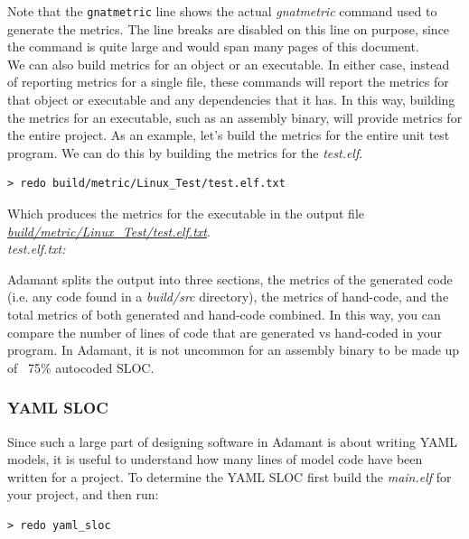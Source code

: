 Note that the \texttt{gnatmetric} line shows the actual \textit{gnatmetric} command used to generate the metrics. The line breaks are disabled on this line on purpose, since the command is quite large and would span many pages of this document. \\

We can also build metrics for an object or an executable. In either case, instead of reporting metrics for a single file, these commands will report the metrics for that object or executable and any dependencies that it has. In this way, building the metrics for an executable, such as an assembly binary, will provide metrics for the entire project. As an example, let's build the metrics for the entire unit test program. We can do this by building the metrics for the \textit{test.elf}.

\vspace{5mm} %
\begin{verbatim}
> redo build/metric/Linux_Test/test.elf.txt
\end{verbatim}
\vspace{5mm} %

Which produces the metrics for the executable in the output file \textit{\url{build/metric/Linux\_Test/test.elf.txt}}. \\

\textit{test.elf.txt:}

Adamant splits the output into three sections, the metrics of the generated code (i.e. any code found in a \textit{build/src} directory), the metrics of hand-code, and the total metrics of both generated and hand-code combined. In this way, you can compare the number of lines of code that are generated vs hand-coded in your program. In Adamant, it is not uncommon for an assembly binary to be made up of ~75\% autocoded SLOC.

\subsubsection{YAML SLOC}

Since such a large part of designing software in Adamant is about writing YAML models, it is useful to understand how many lines of model code have been written for a project. To determine the YAML SLOC first build the \textit{main.elf} for your project, and then run:

\vspace{5mm} %
\begin{verbatim}
> redo yaml_sloc
\end{verbatim}
\vspace{5mm} %

